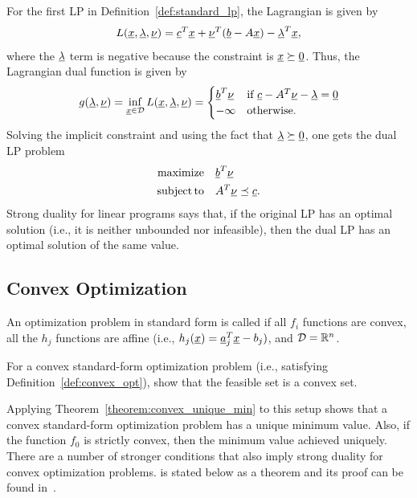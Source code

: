 \begin{example}
For the first LP in Definition~\ref{def:standard_lp}, the Lagrangian is given by
	\[ L(\underline{x},\underline{\lambda},\underline{\nu}) = \underline{c}^T \underline{x} + \underline{\nu}^T (\underline{b} - A\underline{x}) - \underline{\lambda}^T \underline{x}, \]
	where the $\underline{\lambda}$ term is negative because the constraint is $\underline{x} \succeq \underline{0}$.
Thus, the Lagrangian dual function is given by
\begin{equation*}
g(\underline{\lambda},\underline{\nu})
= \inf_{\underline{x}\in \mathcal{D}} L(\underline{x},\underline{\lambda},\underline{\nu})
	= \begin{cases} \underline{b}^T \underline{\nu} & \text{if } \underline{c} - A^T \underline{\nu} - \underline{\lambda} = \underline{0} \\
-\infty & \text{otherwise}. \end{cases}
\end{equation*}
Solving the implicit constraint and using the fact that $\underline{\lambda} \succeq \underline{0}$, one gets the dual LP problem
\begin{align*}
\mathrm{maximize} \quad & \underline{b}^T \underline{\nu} \\
	\mathrm{subject\,to} \quad & A^T \underline{\nu} \preceq \underline{c}.
\end{align*}
Strong duality for linear programs says that, if the original LP has an optimal solution (i.e., it is neither unbounded nor infeasible), then the dual LP has an optimal solution of the same value.
\end{example}

\subsection{Convex Optimization}

\begin{definition} \label{def:convex_opt}
An optimization problem in standard form is called  if all $f_i$ functions are convex, all the $h_j$ functions are affine (i.e., $h_j(\underline{x}) = \underline{a}_j^T \underline{x} - b_j)$, and $\mathcal{D}=\mathbb{R}^n$. 
\end{definition}

\begin{problem}
For a convex standard-form optimization problem (i.e.,  satisfying Definition~\ref{def:convex_opt}), show that the feasible set is a convex set.
\end{problem}

Applying Theorem~\ref{theorem:convex_unique_min} to this setup shows that a convex standard-form optimization problem has a unique minimum value.
Also, if the function $f_0$ is strictly convex, then the minimum value achieved uniquely.
There are a number of stronger conditions that also imply strong duality for convex optimization problems.
 is stated below as a theorem and its proof can be found in~\cite[Sec.~5.3.2]{Boyd-2004}.
 
